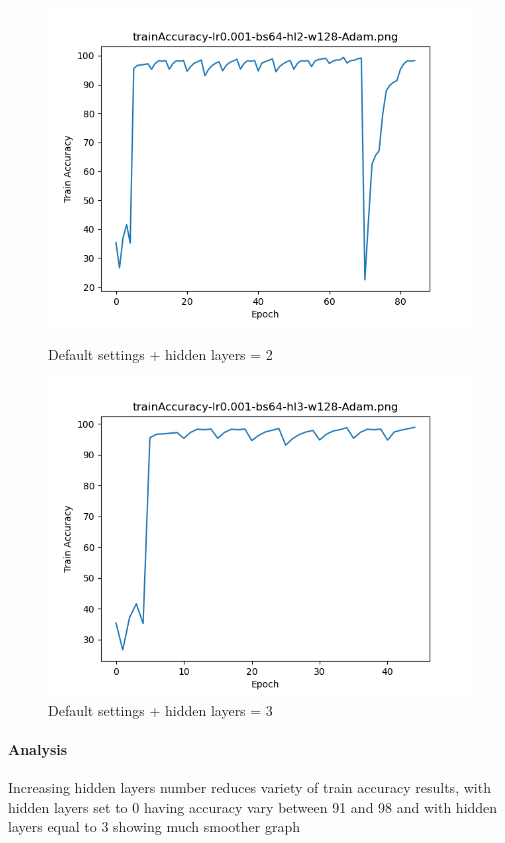 \documentclass{article}[12pt]
\begin{document}
        \begin{figure}[H]
        \includegraphics[width=\linewidth]{testsResults/trainAccuracy/def.png}
        \caption{Default settings + hidden layers = 2}
        \endminipage
        \includegraphics[width=\linewidth]{testsResults/trainAccuracy/trainAccuracy-lr0.001-bs64-hl3-w128-Adam.png}
        \caption{Default settings + hidden layers = 3}
        \endminipage
    \end{figure}

    \paragraph{Analysis} Increasing hidden layers number reduces variety of train accuracy results, with hidden layers set to 0 having accuracy vary between 91 and 98 and with hidden layers equal to 3 showing much smoother graph
\end{document}
